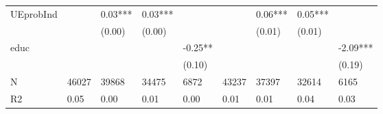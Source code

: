 \documentclass{report}
\begin{document}
\begin{table}
\begin{tabular}{lllllllll}
UEprobInd          &           &    0.03*** &     0.03*** &              &            &     0.06*** &      0.05*** &               \\
                   &           &     (0.00) &      (0.00) &              &            &      (0.01) &       (0.01) &               \\
educ               &           &            &             &      -0.25** &            &             &              &      -2.09*** \\
                   &           &            &             &       (0.10) &            &             &              &        (0.19) \\
N                  &     46027 &      39868 &       34475 &         6872 &      43237 &       37397 &        32614 &          6165 \\
R2                 &      0.05 &       0.00 &        0.01 &         0.00 &       0.01 &        0.01 &         0.04 &          0.03 \\
\bottomrule
\end{tabular}
\end{table}
\end{document}
